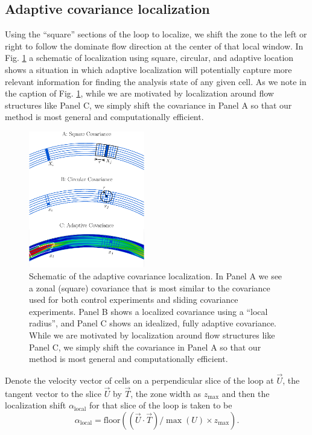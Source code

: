 \documentclass[pre,twocolumn,twoside,byrevtex,superscriptaddress]{revtex4}
\begin{document}
\subsection*{Adaptive covariance localization}

Using the ``square'' sections of the loop to localize, we shift the zone to the left or right to follow the dominate flow direction at the center of that local window.
In Fig. \ref{fig:covariance-localization-schematic} a schematic of localization using square, circular, and adaptive location shows a situation in which adaptive localization will potentially capture more relevant information for finding the analysis state of any given cell.
As we note in the caption of Fig. \ref{fig:covariance-localization-schematic}, while we are motivated by localization around flow structures like Panel C, we simply shift the covariance in Panel A so that our method is most general and computationally efficient.

\begin{figure}[h]
  \centering
  \includegraphics[width=0.45\textwidth]{fig05_covariance-localization-schematic-labeled-004.pdf}
  \caption[]{
    Schematic of the adaptive covariance localization.
    In Panel A we see a zonal (square) covariance that is most similar to the covariance used for both control experiments and sliding covariance experiments.
    Panel B shows a localized covariance using a ``local radius'', and Panel C shows an idealized, fully adaptive covariance.
    While we are motivated by localization around flow structures like Panel C, we simply shift the covariance in Panel A so that our method is most general and computationally efficient.
  }
  \label{fig:covariance-localization-schematic}
\end{figure}

Denote the velocity vector of cells on a perpendicular slice of the loop at $\vec{U}$, the tangent vector to the slice $\vec{U}$ by $\vec{T}$, the zone width as $z_{\text{max}}$ and then the localization shift $\alpha_{\text{local}}$ for that slice of the loop is taken to be
\begin{equation} \alpha_{\text{local}} = \text{floor} \left( (\vec{U} \cdot \vec{T})/\max (U) \times z_{\text{max}} \right) . \end{equation}
\end{document}
